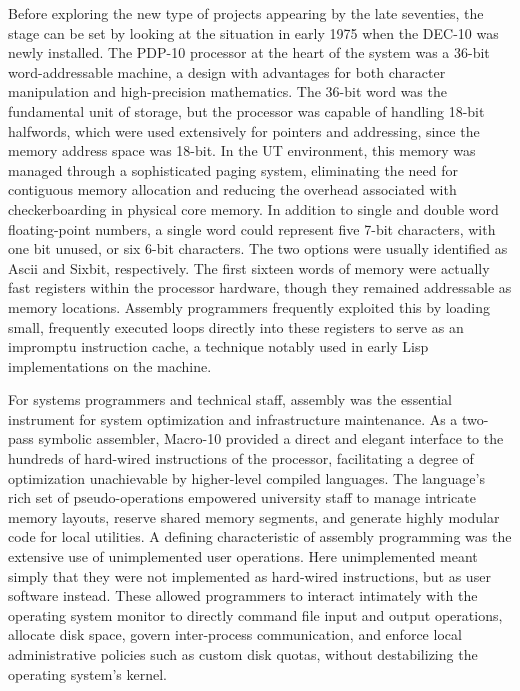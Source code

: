 Before exploring the new type of projects appearing by the late seventies, the stage can be set by looking at the situation in early 1975 when the DEC-10 was newly installed. The PDP-10 processor at the heart of the system was a 36-bit word-addressable machine, a design with advantages for both character manipulation and high-precision mathematics. The 36-bit word was the fundamental unit of storage, but the processor was capable of handling 18-bit halfwords, which were used extensively for pointers and addressing, since the memory address space was 18-bit. In the UT environment, this memory was managed through a sophisticated paging system, eliminating the need for contiguous memory allocation and reducing the overhead associated with checkerboarding in physical core memory. In addition to single and double word floating-point numbers, a single word could represent five 7-bit characters, with one bit unused, or six 6-bit characters. The two options were usually identified as Ascii and Sixbit, respectively. The first sixteen words of memory were actually fast registers within the processor hardware, though they remained addressable as memory locations. Assembly programmers frequently exploited this by loading small, frequently executed loops directly into these registers to serve as an impromptu instruction cache, a technique notably used in early Lisp implementations on the machine. 

For systems programmers and technical staff, assembly was the essential instrument for system optimization and infrastructure maintenance. As a two-pass symbolic assembler, Macro-10 provided a direct and elegant interface to the hundreds of hard-wired instructions of the processor, facilitating a degree of optimization unachievable by higher-level compiled languages. The language's rich set of pseudo-operations empowered university staff to manage intricate memory layouts, reserve shared memory segments, and generate highly modular code for local utilities. A defining characteristic of assembly programming was the extensive use of unimplemented user operations. Here unimplemented meant simply that they were not implemented as hard-wired instructions, but as user software instead. These allowed programmers to interact intimately with the operating system monitor to directly command file input and output operations, allocate disk space, govern inter-process communication, and enforce local administrative policies such as custom disk quotas, without destabilizing the operating system's kernel. 

